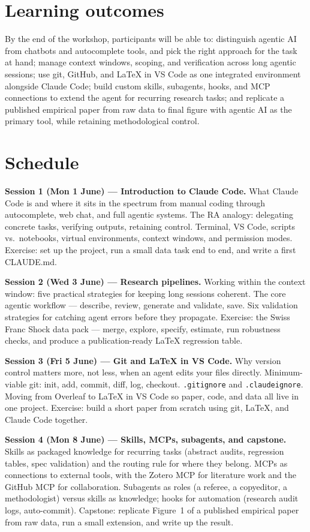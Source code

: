 \documentclass[11pt]{article}
\begin{document}
\section*{Learning outcomes}

By the end of the workshop, participants will be able to: distinguish agentic AI from chatbots and autocomplete tools, and pick the right approach for the task at hand; manage context windows, scoping, and verification across long agentic sessions; use git, GitHub, and LaTeX in VS Code as one integrated environment alongside Claude Code; build custom skills, subagents, hooks, and MCP connections to extend the agent for recurring research tasks; and replicate a published empirical paper from raw data to final figure with agentic AI as the primary tool, while retaining methodological control.

\section*{Schedule}

\textbf{Session 1 (Mon 1 June) — Introduction to Claude Code.} What Claude Code is and where it sits in the spectrum from manual coding through autocomplete, web chat, and full agentic systems. The RA analogy: delegating concrete tasks, verifying outputs, retaining control. Terminal, VS Code, scripts vs.\ notebooks, virtual environments, context windows, and permission modes. Exercise: set up the project, run a small data task end to end, and write a first CLAUDE.md.

\textbf{Session 2 (Wed 3 June) — Research pipelines.} Working within the context window: five practical strategies for keeping long sessions coherent. The core agentic workflow — describe, review, generate and validate, save. Six validation strategies for catching agent errors before they propagate. Exercise: the Swiss Franc Shock data pack — merge, explore, specify, estimate, run robustness checks, and produce a publication-ready LaTeX regression table.

\textbf{Session 3 (Fri 5 June) — Git and LaTeX in VS Code.} Why version control matters more, not less, when an agent edits your files directly. Minimum-viable git: init, add, commit, diff, log, checkout. \texttt{.gitignore} and \texttt{.claudeignore}. Moving from Overleaf to LaTeX in VS Code so paper, code, and data all live in one project. Exercise: build a short paper from scratch using git, LaTeX, and Claude Code together.

\textbf{Session 4 (Mon 8 June) — Skills, MCPs, subagents, and capstone.} Skills as packaged knowledge for recurring tasks (abstract audits, regression tables, spec validation) and the routing rule for where they belong. MCPs as connections to external tools, with the Zotero MCP for literature work and the GitHub MCP for collaboration. Subagents as roles (a referee, a copyeditor, a methodologist) versus skills as knowledge; hooks for automation (research audit logs, auto-commit). Capstone: replicate Figure~1 of a published empirical paper from raw data, run a small extension, and write up the result.
\end{document}
